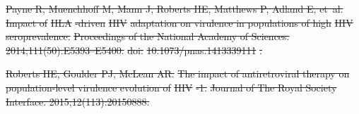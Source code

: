 \documentclass[10pt,letterpaper]{article}
\providecommand{\DIFdeltex}[1]{{\protect\color{red}\sout{#1}}}                      %
\providecommand{\DIFaddbegin}{} %
\providecommand{\DIFaddend}{} %
\providecommand{\DIFdelend}{} %
\providecommand{\DIFdel}[1]{\texorpdfstring{\DIFdeltex{#1}}{}} %
\newcommand{\DIFaddincludegraphics}[2][]{{\color{blue}\fbox{\DIFOincludegraphics[#1]{#2}}}} %
\DeclareRobustCommand{\DIFaddbegin}{\DIFOaddbegin \let\includegraphics\DIFaddincludegraphics} %
\DeclareRobustCommand{\DIFaddend}{\DIFOaddend \let\includegraphics\DIFOincludegraphics} %
\DeclareRobustCommand{\DIFdelend}{\DIFOaddend \let\includegraphics\DIFOincludegraphics} %
\begin{document}
\DIFdel{Payne R, Muenchhoff M, Mann J, Roberts HE, Matthews P, Adland E, et~al.
}%
\DIFdel{Impact of }%
\DIFdel{HLA}%
\DIFdel{-driven }%
\DIFdel{HIV}%
\DIFdel{adaptation on virulence in populations
  of high }%
\DIFdel{HIV}%
\DIFdel{seroprevalence.
}%
\DIFdel{Proceedings of the National Academy of Sciences.
  2014;111(50):E5393--E5400. }%
\DIFdel{doi:}%
\DIFdel{10.1073/pnas.1413339111}%
\DIFdel{.
}%

\DIFdel{Roberts HE, Goulder PJ, McLean AR.
}%
\DIFdel{The impact of antiretroviral therapy on population-level virulence
  evolution of }%
\DIFdel{HIV}%
\DIFdel{-1.
}%
\DIFdel{Journal of The Royal Society Interface.
2015;12(113):20150888.
}%


\DIFdelend \DIFaddbegin 
 \DIFaddend
\end{document}
